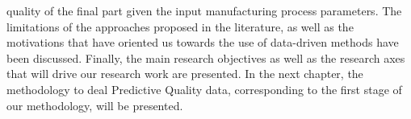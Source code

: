 quality of the final part given the input manufacturing process parameters. The limitations of the approaches proposed in the literature, as well as the motivations that have oriented us towards the use of data-driven methods have been discussed. Finally, the main research objectives as well as the research axes that will drive our research work are presented. In the next chapter, the methodology to deal Predictive Quality data, corresponding to the first stage of our methodology, will be presented.
